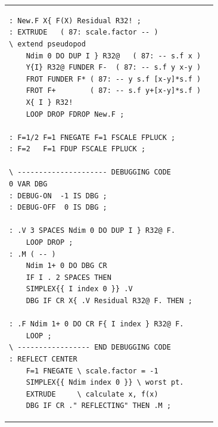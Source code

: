 \begin{figure}[H]
\begin{tabular}{l|l}
\begin{lstlisting}
: New.F X{ F(X) Residual R32! ;
: EXTRUDE   ( 87: scale.factor -- )
\ extend pseudopod
    Ndim 0 DO DUP I } R32@   ( 87: -- s.f x )
    Y{I} R32@ FUNDER F-  ( 87: -- s.f y x-y )
    FROT FUNDER F* ( 87: -- y s.f [x-y]*s.f )
    FROT F+        ( 87: -- s.f y+[x-y]*s.f )
    X{ I } R32!
    LOOP DROP FDROP New.F ;

: F=1/2 F=1 FNEGATE F=1 FSCALE FPLUCK ;
: F=2   F=1 FDUP FSCALE FPLUCK ;

\ --------------------- DEBUGGING CODE
0 VAR DBG
: DEBUG-ON  -1 IS DBG ;
: DEBUG-OFF  0 IS DBG ;

: .V 3 SPACES Ndim 0 DO DUP I } R32@ F.
    LOOP DROP ;
: .M ( -- )
    Ndim 1+ 0 DO DBG CR
    IF I . 2 SPACES THEN
    SIMPLEX{{ I index 0 }} .V
    DBG IF CR X{ .V Residual R32@ F. THEN ;

: .F Ndim 1+ 0 DO CR F{ I index } R32@ F.
    LOOP ;
\ ----------------- END DEBUGGING CODE
: REFLECT CENTER
    F=1 FNEGATE \ scale.factor = -1
    SIMPLEX{{ Ndim index 0 }} \ worst pt.
    EXTRUDE     \ calculate x, f(x)
    DBG IF CR ." REFLECTING" THEN .M ;
        \end{lstlisting}
    \end{tabular}
\end{figure}

